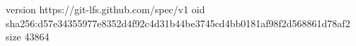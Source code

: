 version https://git-lfs.github.com/spec/v1
oid sha256:d57e34355977e8352d4f92c4d31b44be3745cd4bb0181af98f2d568861d78af2
size 43864
